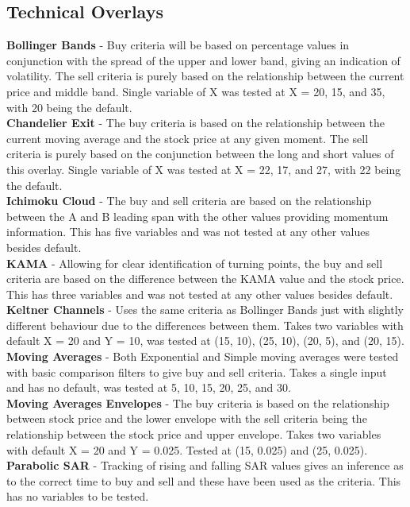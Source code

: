 \documentclass[conference]{IEEEtran}
\begin{document}
\subsection{Technical Overlays}

\noindent
\textbf{Bollinger Bands} - Buy criteria will be based on percentage values in conjunction with the spread of the upper and lower band, giving an indication of volatility. The sell criteria is purely based on the relationship between the current price and middle band. Single variable of X was tested at X = 20, 15, and 35, with 20 being the default.\\
\textbf{Chandelier Exit} - The buy criteria is based on the relationship between the current moving average and the stock price at any given moment. The sell criteria is purely based on the conjunction between the long and short values of this overlay. Single variable of X was tested at X = 22, 17, and 27, with 22 being the default.\\
\textbf{Ichimoku Cloud} - The buy and sell criteria are based on the relationship between the A and B leading span with the other values providing momentum information. This has five variables and was not tested at any other values besides default.\\
\textbf{KAMA} - Allowing for clear identification of turning points, the buy and sell criteria are based on the difference between the KAMA value and the stock price. This has three variables and was not tested at any other values besides default.\\
\textbf{Keltner Channels} - Uses the same criteria as Bollinger Bands just with slightly different behaviour due to the differences between them. Takes two variables with default X = 20 and Y = 10, was tested at (15, 10), (25, 10), (20, 5), and (20, 15).\\
\textbf{Moving Averages} - Both Exponential and Simple moving averages were tested with basic comparison filters to give buy and sell criteria. Takes a single input and has no default, was tested at 5, 10, 15, 20, 25, and 30.\\
\textbf{Moving Averages Envelopes} - The buy criteria is based on the relationship between stock price and the lower envelope with the sell criteria being the relationship between the stock price and upper envelope. Takes two variables with default X = 20 and Y = 0.025. Tested at (15, 0.025) and (25, 0.025).\\
\textbf{Parabolic SAR} - Tracking of rising and falling SAR values gives an inference as to the correct time to buy and sell and these have been used as the criteria. This has no variables to be tested.\\
\end{document}
